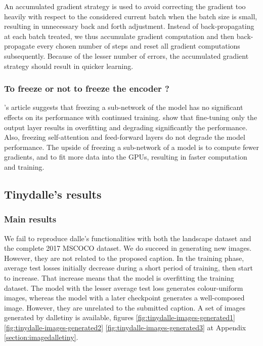 \documentclass{article}
\begin{document}
\begin{multicols}{2}
An accumulated gradient strategy is used to avoid correcting the gradient too heavily with respect to the considered current batch when the batch size is small, resulting in unnecessary back and forth adjustment. Instead of back-propagating at each batch treated, we thus accumulate gradient computation and then back-propagate every chosen number of steps and reset all gradient computations subsequently. Because of the lesser number of errors, the accumulated gradient strategy should result in quicker learning.

\subsubsection{To freeze or not to freeze the encoder ?}

\citeauthor{thompson-etal-2018-freezing}'s article suggests that freezing a sub-network of the model has no significant effects on its performance with continued training. \cite{thompson-etal-2018-freezing} show that fine-tuning only the output layer results in overfitting and degrading significantly the performance. Also, freezing self-attention and feed-forward layers do not degrade the model performance.
The upside of freezing a sub-network of a model is to compute fewer gradients, and to fit more data into the GPUs, resulting in faster computation and training.

\subsection{Tinydalle's results}\label{subsec:tinydalle_results}

\subsubsection{Main results}

We fail to reproduce \gls{dalle}'s functionalities with both the landscape dataset and the complete 2017 MSCOCO dataset. We do succeed in generating new images. However, they are not related to the proposed caption. In the training phase, average test losses initially decrease during a short period of training, then start to increase. That increase means that the model is overfitting the training dataset. The model with the lesser average test loss generates colour-uniform images, whereas the model with a later checkpoint generates a well-composed image. However, they are unrelated to the submitted caption. A set of images generated by \gls{dalletiny} is available, figures \ref{fig:tinydalle-images-generated1} \ref{fig:tinydalle-images-generated2} \ref{fig:tinydalle-images-generated3} at Appendix \ref{section:imagedalletiny}.


\end{multicols}
\end{document}
